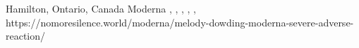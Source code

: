           {
            Hamilton, Ontario, Canada
          }
          {
          }
          {
            Moderna
          }
          {
          }
          {
            ,
            ,
            ,
            ,
            ,
          }
          {
            https://nomoresilence.world/moderna/melody-dowding-moderna-severe-adverse-reaction/
          }


